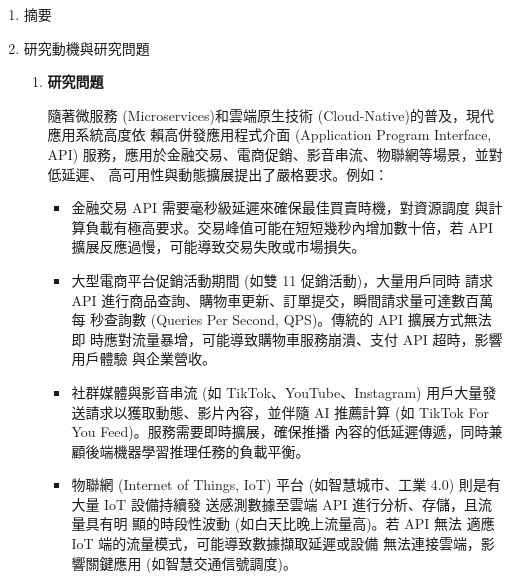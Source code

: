 \documentclass[12pt,a4paper]{article}
\begin{document}
\setlength{\parindent}{2em}


\begin{enumerate}[label={(\zhdig*)}, leftmargin=2\parindent, listparindent=\parindent]

\item 摘要

\item 研究動機與研究問題

\begin{enumerate}[label={(\arabic*)}, leftmargin=\parindent, listparindent=\parindent]

\item\textbf{研究問題}

隨著微服務 (Microservices)\cite{1}和雲端原生技術
(Cloud-Native)\cite{2}的普及，現代應用系統高度依
賴高併發應用程式介面 (Application Program Interface, API)
服務，應用於金融交易、電商促銷、影音串流、物聯網等場景，並對 低延遲、
高可用性與動態擴展提出了嚴格要求。例如：

\begin{itemize}[leftmargin=\parindent, listparindent=\parindent]

\item 金融交易 API 需要毫秒級延遲來確保最佳買賣時機，對資源調度
與計算負載有極高要求。交易峰值可能在短短幾秒內增加數十倍，若 API
擴展反應過慢，可能導致交易失敗或市場損失。\cite{3}

\item 大型電商平台促銷活動期間 (如雙 11 促銷活動)，大量用戶同時
請求API 進行商品查詢、購物車更新、訂單提交，瞬間請求量可達數百萬每
秒查詢數 (Queries Per Second, QPS)。傳統的 API 擴展方式無法即
時應對流量暴增，可能導致購物車服務崩潰、支付 API 超時，影響用戶體驗
與企業營收。\cite{4}

\item 社群媒體與影音串流 (如 TikTok、YouTube、Instagram)
用戶大量發送請求以獲取動態、影片內容，並伴隨 AI 推薦計算
(如 TikTok For You Feed)。服務需要即時擴展，確保推播
內容的低延遲傳遞，同時兼顧後端機器學習推理任務的負載平衡。\cite{5}

\item 物聯網 (Internet of Things, IoT) 平台
(如智慧城市、工業 4.0) 則是有大量 IoT 設備持續發
送感測數據至雲端 API 進行分析、存儲，且流量具有明
顯的時段性波動 (如白天比晚上流量高)。若 API 無法
適應 IoT 端的流量模式，可能導致數據擷取延遲或設備
無法連接雲端，影響關鍵應用 (如智慧交通信號調度)。\cite{6}

\end{itemize}


\end{enumerate}
\end{enumerate}
\end{document}
